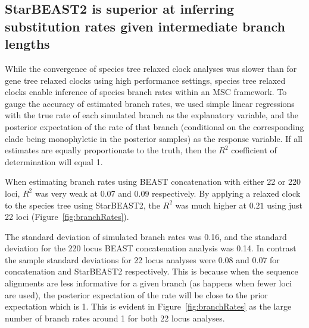 \documentclass[nogrid]{MBE}%
\begin{document}
\subsection{StarBEAST2 is superior at inferring substitution rates given intermediate branch lengths}

While the convergence of species tree relaxed clock analyses was slower than for
gene tree relaxed clocks using high performance settings, species tree
relaxed clocks enable inference of species branch rates within an MSC framework.
To gauge the accuracy of estimated branch rates, we used simple linear
regressions with the true rate of each simulated branch as the explanatory
variable, and the posterior expectation of the rate of that branch (conditional
on the corresponding clade being monophyletic in the posterior samples) as the
response variable. If all estimates are equally proportionate to the truth, then the $R^2$ coefficient
of determination will equal 1.

When estimating branch rates using BEAST concatenation with either 22 or 220 loci,
$R^2$ was very weak at $0.07$ and $0.09$ respectively. By applying a relaxed
clock to the species tree using StarBEAST2, the $R^2$ was much higher at $0.21$
using just 22 loci (Figure~\ref{fig:branchRates}).

The standard deviation of simulated branch rates was 0.16, and the standard
deviation for the 220 locus BEAST concatenation analysis was 0.14. In contrast the
sample standard deviations for 22 locus analyses were 0.08 and 0.07 for
concatenation and StarBEAST2 respectively. This is because when the sequence
alignments are less informative for a given branch (as happens when fewer loci are
used), the posterior expectation of the rate will be close to the prior
expectation which is 1. This is evident in Figure~\ref{fig:branchRates} as the
large number of branch rates around 1 for both 22 locus analyses.
\end{document}
